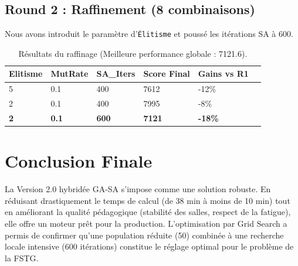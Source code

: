 \documentclass{article}
\begin{document}
\subsection{Round 2 : Raffinement (8 combinaisons)}
Nous avons introduit le paramètre d'\texttt{Élitisme} et poussé les itérations SA à 600.
\begin{table}[h]
\centering
\begin{tabular}{@{}llllll@{}}
\toprule
Elitisme & MutRate & SA\_Iters & Score Final & Gains vs R1 \\ \midrule
5 & 0.1 & 400 & 7612 & -12\% \\
2 & 0.1 & 400 & 7995 & -8\% \\
\textbf{2} & \textbf{0.1} & \textbf{600} & \textbf{7121} & \textbf{-18\%} \\ \bottomrule
\end{tabular}
\caption{Résultats du raffinage (Meilleure performance globale : 7121.6).}
\end{table}

\section{Conclusion Finale}
La Version 2.0 hybridée GA-SA s'impose comme une solution robuste. En réduisant drastiquement le temps de calcul (de 38 min à moins de 10 min) tout en améliorant la qualité pédagogique (stabilité des salles, respect de la fatigue), elle offre un moteur prêt pour la production. L'optimisation par Grid Search a permis de confirmer qu'une population réduite (50) combinée à une recherche locale intensive (600 itérations) constitue le réglage optimal pour le problème de la FSTG.
\end{document}
